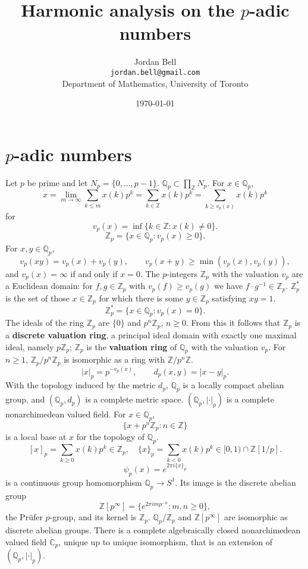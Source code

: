 \documentclass{article}
\theoremstyle{definition}
\begin{document}
\title{Harmonic analysis on the $p$-adic numbers}
\author{Jordan Bell\\ \texttt{jordan.bell@gmail.com}\\Department of Mathematics, University of Toronto}
\date{\today}

\maketitle

\section{$p$-adic numbers}
Let $p$ be prime and let $N_p=\{0,\ldots,p-1\}$.
$\mathbb{Q}_p \subset \prod_{\mathbb{Z}} N_p$. For $x \in \mathbb{Q}_p$,
\[
x =\lim_{m \to \infty} \sum_{k \leq m} x(k) p^k = \sum_{k \in \mathbb{Z}} x(k) p^k = \sum_{k \geq v_p(x)} x(k) p^k
\]
for 
\[
v_p(x) = \inf\{k \in \mathbb{Z}: x(k) \neq 0\}.
\]
\[
\mathbb{Z}_p = \{x \in \mathbb{Q}_p: v_p(x) \geq 0\}.
\]
For $x,y \in \mathbb{Q}_p$,
\[
v_p(xy) = v_p(x)+v_p(y),\qquad v_p(x+y) \geq \min(v_p(x),v_p(y)),
\]
and $v_p(x)=\infty$ if and only if $x=0$. 
The $p$-integers $\mathbb{Z}_p$ with the valuation $v_p$
are a Euclidean domain:
for $f,g \in \mathbb{Z}_p$ with
$v_p(f) \geq v_p(g)$ we have $f\cdot g^{-1} \in \mathbb{Z}_p$.
$\mathbb{Z}_p^*$ is the set of those $x \in \mathbb{Z}_p$ for which there is some $y \in \mathbb{Z}_p$ satisfying $xy=1$.
\[
\mathbb{Z}_p^* = \{x \in \mathbb{Q}_p: v_p(x)=0\}.
\]
The ideals of the ring $\mathbb{Z}_p$ are $\{0\}$ and
$p^n\mathbb{Z}_p$, $n \geq 0$.
From this it follows that $\mathbb{Z}_p$ is a \textbf{discrete valuation ring}, a principal
ideal domain with exactly one maximal ideal, namely $p\mathbb{Z}_p$; $\mathbb{Z}_p$ is the \textbf{valuation ring} of $\mathbb{Q}_p$ with the valuation
$v_p$.
For $n \geq 1$,
$\mathbb{Z}_p/p^n \mathbb{Z}_p$ is isomorphic as a ring with
$\mathbb{Z}/p^n\mathbb{Z}$.
\[
|x|_p = p^{-v_p(x)},\qquad d_p(x,y) = |x-y|_p.
\]
With the topology induced by the metric $d_p$, $\mathbb{Q}_p$ is a locally compact abelian group,
and $(\mathbb{Q}_p,d_p)$ is a complete metric space.
$(\mathbb{Q}_p,|\cdot|_p)$ is a complete nonarchimedean valued field. 
For $x \in \mathbb{Q}_p$,
\[
\{x+p^n \mathbb{Z}_p: n \in \mathbb{Z}\} 
\]
is a local base at $x$ for the topology of $\mathbb{Q}_p$. 
\[
[x]_p = \sum_{k \geq 0} x(k) p^k \in \mathbb{Z}_p,\quad \{x\}_p = \sum_{k<0} x(k) p^k \in [0,1) \cap \mathbb{Z}[1/p].
\]
\[
\psi_p(x) = e^{2\pi i\{x\}_p}
\]
is a continuous group homomorphism $\mathbb{Q}_p \to S^1$. Its image is the discrete abelian group
\[
\mathbb{Z}[p^\infty] = \{e^{2\pi imp^{-n}}: m,n \geq 0\},
\]
the Pr\"ufer $p$-group,
and its kernel is
$\mathbb{Z}_p$. $\mathbb{Q}_p / \mathbb{Z}_p$ and $\mathbb{Z}[p^\infty]$ are isomorphic as discrete abelian groups.
There is a complete algebraically closed nonarchimedean valued field $\mathbb{C}_p$, unique up to unique
isomorphism, that is an extension of $(\mathbb{Q}_p,|\cdot|_p)$. 
\end{document}
